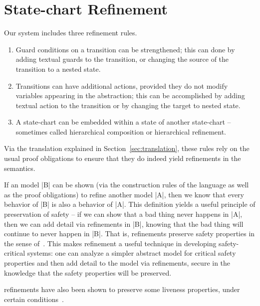 
\section{State-chart Refinement}
\label{sec:scref}

Our system includes three refinement rules.

\begin{enumerate}
\item Guard conditions on a transition can be strengthened; 
this can done by adding textual guards to the transition, or
changing the source of the transition to a nested state.
\item Transitions can have additional actions, provided they do not
  modify variables appearing in the abstraction; this can be 
  accomplished by adding textual action to the transition 
  or by changing the target to nested state.
\item A state-chart can be embedded within a state of another
  state-chart -- sometimes called hierarchical composition or
  hierarchical refinement.
\end{enumerate}

Via the translation explained in Section~\ref{sec:translation}, these rules
rely on the usual \EventB proof obligations to ensure that they do
indeed yield refinements in the \EventB semantics.

If an \EventB model |B| can be shown (via the construction rules of
the \EventB language as well as the proof obligations) to refine
another \EventB model |A|, then we know that every behavior of |B| is
also a behavior of |A|. This definition yields a useful principle of
preservation of safety -- if we can show that a bad thing never
happens in |A|, then we can add detail via refinements in |B|, knowing
that the bad thing will continue to never happen in |B|. That is,
\EventB refinements preserve safety properties in the sense
of~\cite{lamport1977proving}. This makes refinement a useful technique
in developing safety-critical systems: one can analyze a simpler
abstract model for critical safety properties and then add detail to
the model via refinements, secure in the knowledge that the safety
properties will be preserved.

\EventB refinements have also been shown to preserve some liveness
properties, under certain conditions~\cite{hoang2016ltl}.

